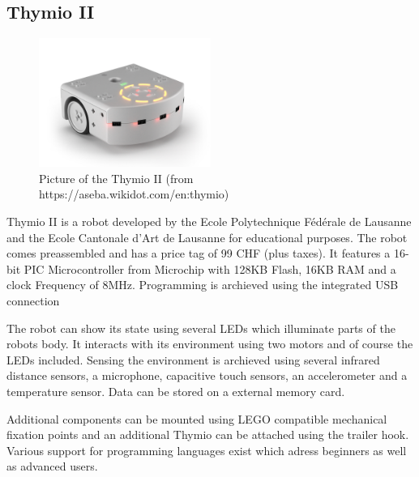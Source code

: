 \documentclass[11pt,a4paper]{article}
\begin{document}
\subsection{Thymio II}
\begin{figure}[h!]
  \centering
  \includegraphics[width=0.5\textwidth]{images/thymioii.jpg}
  \caption{Picture of the Thymio II (from https://aseba.wikidot.com/en:thymio)}
\end{figure}

Thymio II is a robot developed by the Ecole Polytechnique Fédérale de Lausanne and the Ecole Cantonale d'Art de Lausanne for educational purposes. The robot comes preassembled and has a price tag of 99 CHF (plus taxes). It features a 16-bit PIC Microcontroller from Microchip with 128KB Flash, 16KB RAM and a clock Frequency of 8MHz. Programming is archieved using the integrated USB connection

The robot can show its state using several LEDs which illuminate parts of the robots body. It interacts with its environment using two motors and of course the LEDs included. Sensing the environment is archieved using several infrared distance sensors, a microphone, capacitive touch sensors, an accelerometer and a temperature sensor. Data can be stored on a external memory card.

Additional components can be mounted using LEGO compatible mechanical fixation points and an additional Thymio can be attached using the trailer hook. Various support for programming languages exist which adress beginners as well as advanced users.
\end{document}
